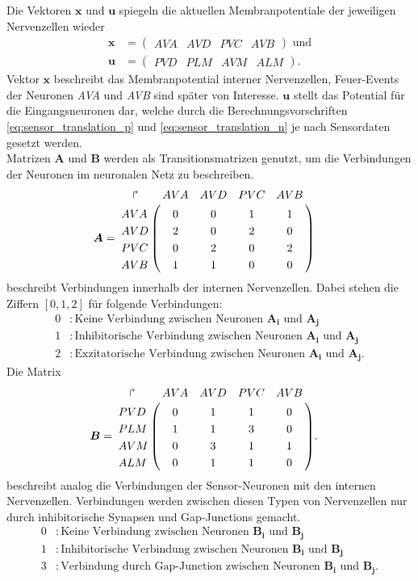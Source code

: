 	Die Vektoren $\boldsymbol{x}$ und $\boldsymbol{u}$ spiegeln die aktuellen Membranpotentiale der jeweiligen Nervenzellen wieder
	\begin{align}
		\boldsymbol{x} &= \begin{pmatrix}AVA & AVD & PVC & AVB\end{pmatrix}\text{ und}\\
		\boldsymbol{u} &= \begin{pmatrix}PVD & PLM & AVM & ALM\end{pmatrix}\text{.}
		\label{eq:xu}
	\end{align}
	Vektor $\boldsymbol{x}$ beschreibt das Membranpotential interner Nervenzellen, Feuer-Events der Neuronen \textit{AVA} und \textit{AVB} sind später von Interesse. $\boldsymbol{u}$ stellt das Potential für die Eingangsneuronen dar, welche durch die Berechnungsvorschriften \ref{eq:sensor_translation_p} und \ref{eq:sensor_translation_n} je nach Sensordaten gesetzt werden.\\
	Matrizen $\boldsymbol{A}$ und $\boldsymbol{B}$ werden als Transitionsmatrizen genutzt, um die Verbindungen der Neuronen im neuronalen Netz zu beschreiben.
	\begin{align}
		\boldsymbol{A} &= \bordermatrix{
		\quad\Rsh& AVA & AVD & PVC & AVB \cr
			AVA &  0  &  0  &  1  &  1  \cr
			AVD &  2  &  0  &  2  &  0  \cr
			PVC &  0  &  2  &  0  &  2  \cr
			AVB &  1  &  1  &  0  &  0  \cr
		}
	\end{align}
	beschreibt Verbindungen innerhalb der internen Nervenzellen. Dabei stehen die Ziffern $[0,1,2]$ für folgende Verbindungen:
	\begin{align*}
		0 &: \text{Keine Verbindung zwischen Neuronen }\boldsymbol{A_i}\text{ und } \boldsymbol{A_j}\\
		1 &: \text{Inhibitorische Verbindung zwischen Neuronen }\boldsymbol{A_i}\text{ und }\boldsymbol{A_j}\\
		2 &: \text{Exzitatorische Verbindung zwischen Neuronen }\boldsymbol{A_i}\text{ und }\boldsymbol{A_j}.
	\end{align*}
	Die Matrix
	\begin{align}
	\boldsymbol{B} &= \bordermatrix{
		\quad\Rsh& AVA & AVD & PVC & AVB \cr
			PVD &  0  &  1  &  1  &  0  \cr
			PLM &  1  &  1  &  3  &  0  \cr
			AVM &  0  &  3  &  1  &  1  \cr
			ALM &  0  &  1  &  1  &  0  \cr
		}\text{.}
	\end{align}
	beschreibt analog die Verbindungen der Sensor-Neuronen mit den internen Nervenzellen. Verbindungen werden zwischen diesen Typen von Nervenzellen nur durch inhibitorische Synapsen und Gap-Junctions gemacht.
	\begin{align*}
		0 &: \text{Keine Verbindung zwischen Neuronen }\boldsymbol{B_i}\text{ und } \boldsymbol{B_j}\\
		1 &: \text{Inhibitorische Verbindung zwischen Neuronen }\boldsymbol{B_i}\text{ und }\boldsymbol{B_j}\\
		3 &: \text{Verbindung durch Gap-Junction zwischen Neuronen }\boldsymbol{B_i}\text{ und }\boldsymbol{B_j}.
	\end{align*}

